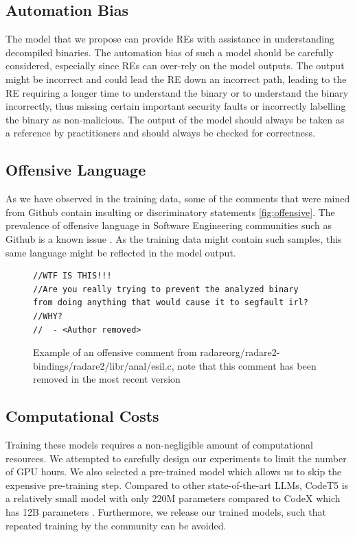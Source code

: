 \subsection{Automation Bias}
The model that we propose can provide REs with assistance in understanding decompiled binaries. The automation bias of such a model should be carefully considered, especially since REs can over-rely on the model outputs. The output might be incorrect and could lead the RE down an incorrect path, leading to the RE requiring a longer time to understand the binary or to understand the binary incorrectly, thus missing certain important security faults or incorrectly labelling the binary as non-malicious. The output of the model should always be taken as a reference by practitioners and should always be checked for correctness.

\subsection{Offensive Language}
As we have observed in the training data, some of the comments that were mined from Github contain insulting or discriminatory statements \ref{fig:offensive}. The prevalence of offensive language in Software Engineering communities such as Github is a known issue \cite{OffensiveLanguage}. As the training data might contain such samples, this same language might be reflected in the model output. 
\label{fig:offensive}
\begin{figure}[H]
  \centering
\begin{lstlisting}
//WTF IS THIS!!!
//Are you really trying to prevent the analyzed binary 
from doing anything that would cause it to segfault irl?
//WHY?
//	- <Author removed>
\end{lstlisting}
  \caption{Example of an offensive comment from radareorg/radare2-bindings/radare2/libr/anal/esil.c, note that this comment has been removed in the most recent version}
\end{figure}


\subsection{Computational Costs}
Training these models requires a non-negligible amount of computational resources. We attempted to carefully design our experiments to limit the number of GPU hours. We also selected a pre-trained model which allows us to skip the expensive pre-training step. Compared to other state-of-the-art LLMs, CodeT5 is a relatively small model with only 220M parameters compared to CodeX which has 12B parameters \cite{CodeX}. Furthermore, we release our trained models, such that repeated training by the community can be avoided.

